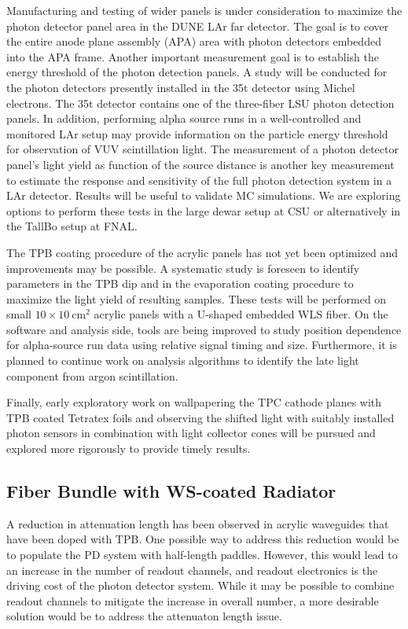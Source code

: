 Manufacturing and testing of wider panels is under consideration to
maximize the photon detector panel area in the DUNE LAr far
detector. The goal is to cover the entire anode plane assembly (APA)
area with photon detectors embedded into the APA frame.  Another
important measurement goal is to establish the energy threshold of the
photon detection panels. A study will be conducted for the photon
detectors presently installed in the 35t detector  using Michel
electrons. The 35t detector contains one of the three-fiber LSU photon
detection panels. In addition, performing alpha source runs in a well-controlled
and monitored LAr setup may provide information on the particle energy
threshold for observation of VUV scintillation light.  The measurement
of a photon detector panel's light yield as function of the source
distance is another key measurement to estimate the response and
sensitivity of the full photon detection system in a LAr
detector. Results will be useful to validate MC simulations.  We are
exploring options to perform these tests in the large dewar setup at
CSU or alternatively in the TallBo setup  at FNAL.

The TPB coating procedure of the acrylic panels has not yet been
optimized and improvements may be possible. A systematic
study is foreseen to identify parameters in the TPB dip and %
in the
evaporation coating procedure to maximize the light yield of resulting
samples. These tests will be performed on small
$10\times10~\mathrm{cm}^2$ acrylic panels with a U-shaped embedded WLS
fiber.  On the software and analysis side, %
tools are being improved to study position dependence for alpha-source run
data using relative signal timing and size. Furthermore, it is planned to
continue work on analysis algorithms to identify the late light
component from argon scintillation.

Finally, early exploratory work on wallpapering the TPC cathode planes
with TPB coated Tetratex foils and observing the shifted light with
suitably installed photon sensors in combination with light collector
cones will be pursued and explored more rigorously to provide timely
results.


\subsection{Fiber Bundle with WS-coated Radiator}

A reduction in attenuation length has been observed in
acrylic waveguides that have been doped with TPB. One possible way to
address this reduction would be to populate the PD system with half-length
paddles. However, this would lead to an increase in the number of readout
channels, and readout
electronics is the driving cost of the photon detector system. While it may be possible to combine readout channels to
mitigate the increase in overall number, a more desirable solution
would be to address the attenuaton length issue.    

